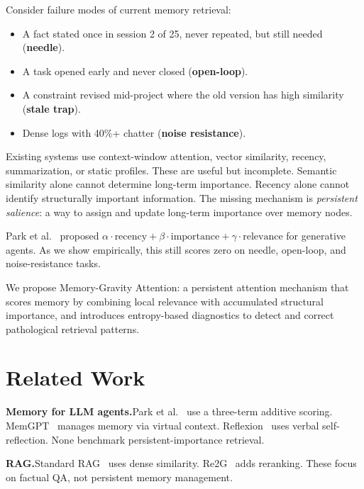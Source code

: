 \documentclass{article}
\newcommand{\MGA}{Memory-Gravity Attention}
\begin{document}
Consider failure modes of current memory retrieval:
\begin{itemize}[leftmargin=2em,itemsep=2pt]
\item A fact stated once in session 2 of 25, never repeated, but still needed (\textbf{needle}).
\item A task opened early and never closed (\textbf{open-loop}).
\item A constraint revised mid-project where the old version has high similarity (\textbf{stale trap}).
\item Dense logs with 40\%+ chatter (\textbf{noise resistance}).
\end{itemize}

Existing systems use context-window attention, vector similarity, recency, summarization, or static profiles. These are useful but incomplete. Semantic similarity alone cannot determine long-term importance. Recency alone cannot identify structurally important information. The missing mechanism is \emph{persistent salience}: a way to assign and update long-term importance over memory nodes.

Park et al.~\citep{park2023generative} proposed $\alpha \cdot \text{recency} + \beta \cdot \text{importance} + \gamma \cdot \text{relevance}$ for generative agents. As we show empirically, this still scores zero on needle, open-loop, and noise-resistance tasks.

We propose \MGA{}: a persistent attention mechanism that scores memory by combining local relevance with accumulated structural importance, and introduces entropy-based diagnostics to detect and correct pathological retrieval patterns.

\section{Related Work}

\textbf{Memory for LLM agents.}\quad Park et al.~\citep{park2023generative} use a three-term additive scoring. MemGPT~\citep{packer2023memgpt} manages memory via virtual context. Reflexion~\citep{shinn2023reflexion} uses verbal self-reflection. None benchmark persistent-importance retrieval.

\textbf{RAG.}\quad Standard RAG~\citep{lewis2020retrieval} uses dense similarity. Re2G~\citep{glass2022re2g} adds reranking. These focus on factual QA, not persistent memory management.
\end{document}
